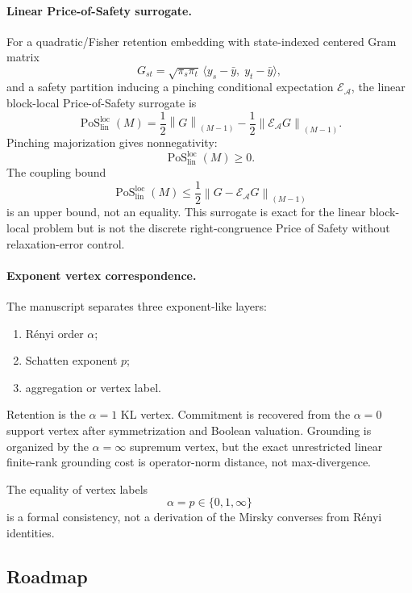 \documentclass[12pt]{article}
\theoremstyle{definition}
\DeclareMathOperator{\PoS}{PoS}
\newcommand{\EA}{\mathcal E_{\mathcal A}}
\newcommand{\KyF}[2]{\left\|#1\right\|_{(#2)}}
\newcommand{\PoSlin}{\PoS_{\mathrm{lin}}^{\mathrm{loc}}}
\begin{document}
\paragraph{Linear Price-of-Safety surrogate.}
For a quadratic/Fisher retention embedding with state-indexed centered Gram
matrix
\[
G_{st}
=
\sqrt{\pi_s\pi_t}\,
\langle y_s-\bar y,\;y_t-\bar y\rangle,
\]
and a safety partition inducing a pinching conditional expectation
$\EA$, the linear block-local Price-of-Safety surrogate is
\[
\PoSlin(M)
=
\frac12\KyF{G}{M-1}
-
\frac12\KyF{\EA G}{M-1}.
\]
Pinching majorization gives nonnegativity:
\[
\PoSlin(M)\ge0.
\]
The coupling bound
\[
\PoSlin(M)
\le
\frac12\KyF{G-\EA G}{M-1}
\]
is an upper bound, not an equality.  This surrogate is exact for the linear
block-local problem but is not the discrete right-congruence Price of Safety
without relaxation-error control.

\paragraph{Exponent vertex correspondence.}
The manuscript separates three exponent-like layers:
\begin{enumerate}[nosep,label=(\arabic*)]
\item R\'enyi order $\alpha$;
\item Schatten exponent $p$;
\item aggregation or vertex label.
\end{enumerate}

Retention is the $\alpha=1$ KL vertex.  Commitment is recovered from the
$\alpha=0$ support vertex after symmetrization and Boolean valuation.
Grounding is organized by the $\alpha=\infty$ supremum vertex, but the exact
unrestricted linear finite-rank grounding cost is operator-norm distance, not
max-divergence.

The equality of vertex labels
\[
\alpha=p\in\{0,1,\infty\}
\]
is a formal consistency, not a derivation of the Mirsky converses from
R\'enyi identities.

\subsection{Roadmap}
\label{subsec:roadmap}
\end{document}
